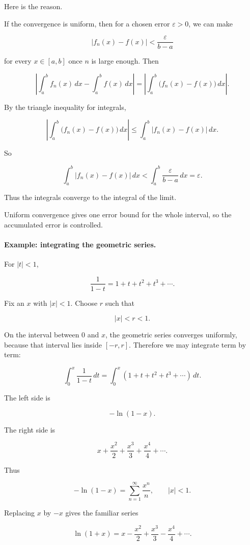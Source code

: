 Here is the reason.

If the convergence is uniform, then for a chosen error \(\varepsilon>0\), we can make

\[
|f_n(x)-f(x)|
<
\frac{\varepsilon}{b-a}
\]

for every \(x\in[a,b]\) once \(n\) is large enough.  Then

\[
\left|
\int_a^b f_n(x)\,dx-\int_a^b f(x)\,dx
\right|
=
\left|
\int_a^b \bigl(f_n(x)-f(x)\bigr)\,dx
\right|.
\]

By the triangle inequality for integrals,

\[
\left|
\int_a^b \bigl(f_n(x)-f(x)\bigr)\,dx
\right|
\le
\int_a^b |f_n(x)-f(x)|\,dx.
\]

So

\[
\int_a^b |f_n(x)-f(x)|\,dx
<
\int_a^b \frac{\varepsilon}{b-a}\,dx
=
\varepsilon.
\]

Thus the integrals converge to the integral of the limit.

Uniform convergence gives one error bound for the whole interval, so the accumulated
error is controlled.

\paragraph{Example: integrating the geometric series.}
For \(|t|<1\),

\[
\frac1{1-t}=1+t+t^2+t^3+\cdots.
\]

Fix an \(x\) with \(|x|<1\).  Choose \(r\) such that

\[
|x|<r<1.
\]

On the interval between \(0\) and \(x\), the geometric series converges uniformly,
because that interval lies inside \([-r,r]\).  Therefore we may integrate term by term:

\[
\int_0^x \frac1{1-t}\,dt
=
\int_0^x (1+t+t^2+t^3+\cdots)\,dt.
\]

The left side is

\[
-\ln(1-x).
\]

The right side is

\[
x+\frac{x^2}{2}+\frac{x^3}{3}+\frac{x^4}{4}+\cdots.
\]

Thus

\[
\boxed{
-\ln(1-x)
=
\sum_{n=1}^{\infty}\frac{x^n}{n},
\qquad |x|<1.
}
\]

Replacing \(x\) by \(-x\) gives the familiar series

\[
\ln(1+x)
=
x-\frac{x^2}{2}+\frac{x^3}{3}-\frac{x^4}{4}+\cdots.
\]

